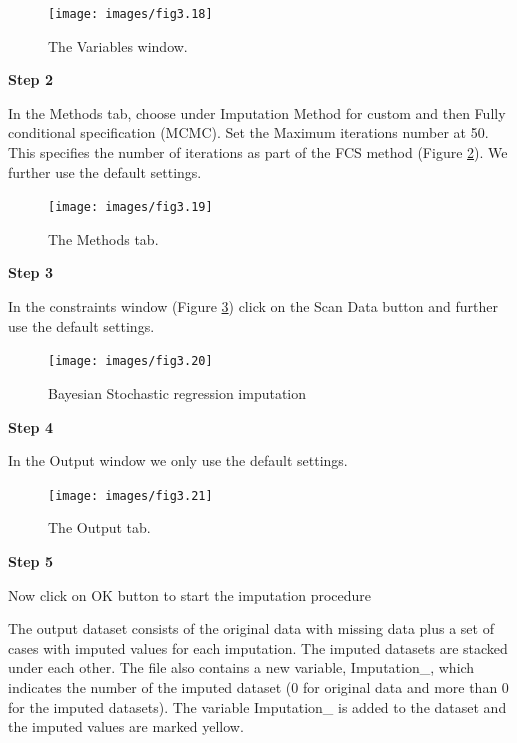 \documentclass[
]{book}
\begin{document}
\begin{figure}

{\centering \texttt{[image: images/fig3.18]} 

}

\caption{The Variables window.}\label{fig:fig3-18}
\end{figure}

\textbf{Step 2}

In the Methods tab, choose under Imputation Method for custom and then Fully conditional specification (MCMC). Set the Maximum iterations number at 50. This specifies the number of iterations as part of the FCS method (Figure \ref{fig:fig3-19}). We further use the default settings.

\begin{figure}

{\centering \texttt{[image: images/fig3.19]} 

}

\caption{The Methods tab.}\label{fig:fig3-19}
\end{figure}

\textbf{Step 3}

In the constraints window (Figure \ref{fig:fig3-20}) click on the Scan Data button and further use the default settings.

\begin{figure}

{\centering \texttt{[image: images/fig3.20]} 

}

\caption{Bayesian Stochastic regression imputation}\label{fig:fig3-20}
\end{figure}

\textbf{Step 4}

In the Output window we only use the default settings.

\begin{figure}

{\centering \texttt{[image: images/fig3.21]} 

}

\caption{The Output tab.}\label{fig:fig3-21}
\end{figure}

\textbf{Step 5}

Now click on OK button to start the imputation procedure

The output dataset consists of the original data with missing data plus a set of cases with imputed values for each imputation. The imputed datasets are stacked under each other. The file also contains a new variable, Imputation\_, which indicates the number of the imputed dataset (0 for original data and more than 0 for the imputed datasets). The variable Imputation\_ is added to the dataset and the imputed values are marked yellow.
\end{document}
